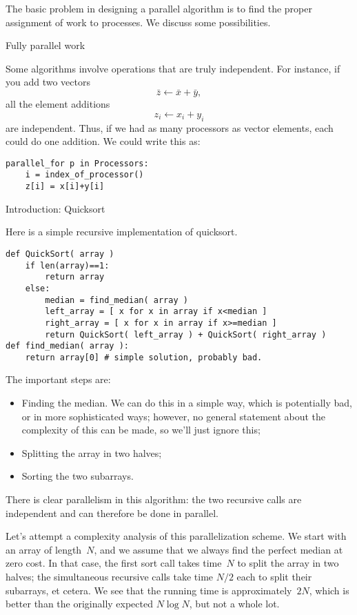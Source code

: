 
The basic problem in designing a parallel algorithm is to find the proper assignment
of work to processes. We discuss some possibilities.

 {Fully parallel work}

Some algorithms involve operations that are truly independent.
For instance, if you add two vectors
\[ \bar z\leftarrow \bar x + \bar y, \]
all the element additions
\[ z_i\leftarrow x_i+y_i \]
are independent. Thus, if we had as many processors as vector elements,
each could do one addition.
We could write this as:
\begin{verbatim}
parallel_for p in Processors:
    i = index_of_processor()
    z[i] = x[i]+y[i]
\end{verbatim}

 {Introduction: Quicksort}

Here is a simple recursive implementation of quicksort.
\begin{verbatim}
def QuickSort( array )
    if len(array)==1:
        return array
    else:
        median = find_median( array )
        left_array = [ x for x in array if x<median ]
        right_array = [ x for x in array if x>=median ]
        return QuickSort( left_array ) + QuickSort( right_array )
def find_median( array ):
    return array[0] # simple solution, probably bad.
\end{verbatim}
The important steps are:
\begin{itemize}
\item Finding the median. We can do this in a simple way, which is potentially bad, or
  in more sophisticated ways; however, no general statement about the complexity of this can be made,
  so we'll just ignore this;
\item Splitting the array in two halves;
\item Sorting the two subarrays.
\end{itemize}
There is clear parallelism in this algorithm: the two recursive calls
are independent and can therefore be done in parallel.

Let's attempt a complexity analysis of this parallelization scheme.
We start with an array of length~$N$, and we assume that we always
find the perfect median at zero cost.  In that case, the first sort
call takes time~$N$ to split the array in two halves; the simultaneous
recursive calls take time $N/2$ each to split their subarrays, et
cetera.  We see that the running time is approximately~$2N$, which is
better than the originally expected $N\log N$, but not a whole lot.

